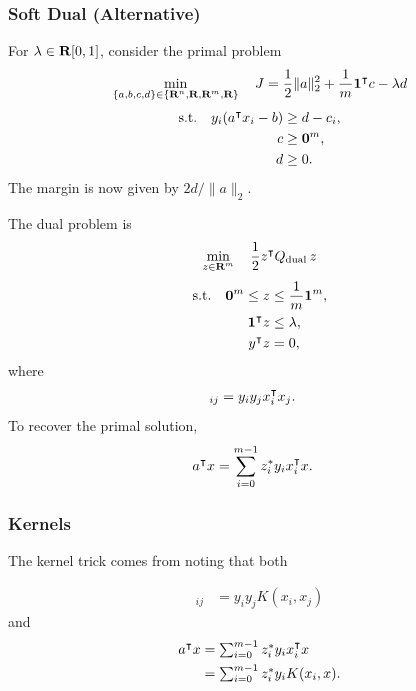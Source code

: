 \documentclass{article}
\begin{document}
\subsubsection{Soft Dual (Alternative)}

    For $\lambda\in\textbf{R}[0,1]$, consider the primal problem
    \begin{align*}
        \min_{\{a,b,c,d\}\in\{\textbf{R}^n,\textbf{R},\textbf{R}^m,\textbf{R}\}}\quad J = \frac{1}{2}\|a\|_2^2
        +\frac{1}{m} \textbf{1}^\intercal c
        -\lambda d
    \end{align*}
    \begin{align*}
        \text{s.t.}\quad y_i(a^\intercal x_i-b)&\geq d-c_i,\\
        c&\geq \textbf{0}^m,\\
        d&\geq 0.
    \end{align*}
    The margin is now given by $2d/\|a\|_2$.

    The dual problem is \cite[p.~319]{ml} 
    \begin{align*}
        \min_{z\in\textbf{R}^m}\quad \frac{1}{2}z^\intercal Q_{\text{dual}\:} z
    \end{align*}
    \begin{align*}
        \text{s.t.}\quad \textbf{0}^m\leq z &\leq \frac{1}{m}\textbf{1}^m,\\
        \textbf{1}^\intercal z&\leq \lambda,\\
        y^\intercal z &=0,
    \end{align*}
    where
    \begin{align*}
        [Q_{\text{dual}\:}]_{ij}
        &=y_i y_j x_i^\tp x_j.
    \end{align*}
    To recover the primal solution,
    \begin{align*}
        a^\intercal x &= \sum_{i=0}^{m-1} z_i^* y_i x_i^\intercal x.
    \end{align*}

\subsubsection{Kernels}\label{sec:kernels}

    The kernel trick comes from noting that both

    \begin{align*}
        [Q_{\text{dual}\:}]_{ij}
        &=y_i y_j K(x_i,x_j)
    \end{align*}    
    and
    \begin{align*}
        a^\intercal x &= \textstyle\sum_{i=0}^{m-1} z_i^* y_i x_i^\intercal x\\
        &= \textstyle\sum_{i=0}^{m-1} z_i^*y_i K(x_i,x).
    \end{align*}
\end{document}
